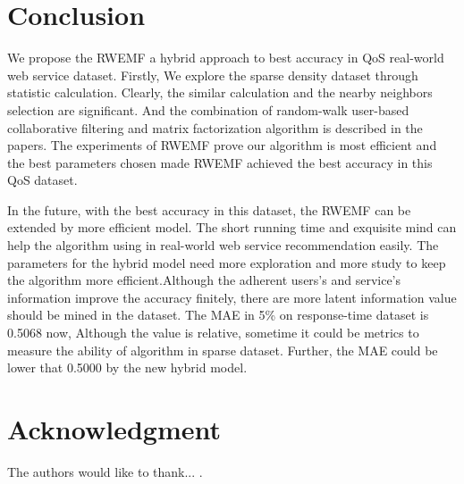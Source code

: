 \documentclass[conference]{IEEEtran}
\begin{document}
\section{Conclusion}\label{S-CN}
\par We propose the RWEMF a hybrid approach to best accuracy in QoS real-world web service dataset. Firstly, We explore the sparse density dataset through statistic calculation. Clearly, the similar calculation and the nearby neighbors selection are significant. And the combination of random-walk user-based collaborative filtering and matrix factorization algorithm is described in the papers. The experiments of RWEMF prove our algorithm is most efficient and the best parameters chosen made RWEMF achieved the best accuracy in this QoS dataset.
\par In the future, with the best accuracy in this dataset, the RWEMF can be extended by more efficient model. The short running time and exquisite mind can help the algorithm using in real-world web service recommendation easily. The parameters for the hybrid model need more exploration and more study to keep the algorithm more efficient.Although the adherent users's and service's information improve the accuracy finitely, there are more latent information value should be mined in the dataset. The MAE in 5\% on response-time dataset is 0.5068 now, Although the value is relative, sometime it could be metrics to measure the ability of algorithm in sparse dataset. Further, the MAE could be lower that 0.5000 by the new hybrid model.

\section*{Acknowledgment}
The authors would like to thank...
\cite{yin_network_2017}
\cite{lo_extended_2012}
\cite{lee_algorithms_2000}
\cite{chen_web_2014}
\cite{liu_location-aware_2016}
\cite{yin_network_2017}
\cite{zhang_exploring_2011}
\cite{li_kuang_personalized_2012}.




% 

\end{document}
